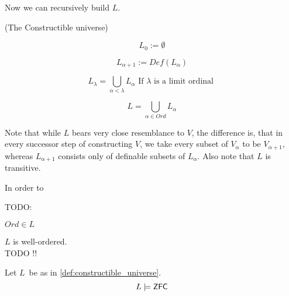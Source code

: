 
Now we can recursively build $L$.
\begin{definition}{(The Constructible universe)}\label{def:constructible_universe}
\bce[(i)]
\item
\begin{equation}
L_0 := \emptyset
\end{equation}

\item
\begin{equation}
L_{\alpha+1} := Def(L_{\alpha})
\end{equation}
\item
\begin{equation}
L_{\lambda} = \bigcup_{\alpha < \lambda} L_{\alpha}\mbox{ If }\lambda\mbox{ is a~limit ordinal }
\end{equation}
\item
\begin{equation}
L = \bigcup_{\alpha\in Ord} L_{\alpha}
\end{equation}
\ece
\end{definition}

Note that while $L$ bears very close resemblance to $V$, the difference is, that in every successor step of constructing $V$, we take every subset of $V_\alpha$ to be $V_{\alpha+1}$, whereas $L_{\alpha+1}$ consists only of definable subsets of $L_\alpha$. Also note that $L$ is transitive.

In order to 

TODO:
\begin{lemma}\label{lemma:ord_in_l}
$Ord \in L$
\end{lemma}

\begin{lemma}\label{lemma:l_wo}
$L$ is well-ordered.\\
TODO !!
\end{lemma}

\begin{theorem}
Let $L$ be as in \ref{def:constructible_universe}.
\begin{equation}
L \models \sf{ZFC}
\end{equation}
\end{theorem}

